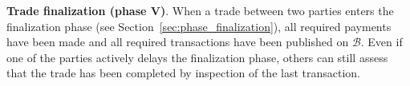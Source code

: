 \textbf{Trade finalization (phase V)}.
When a trade between two parties enters the finalization phase (see Section~\ref{sec:phase_finalization}), all required payments have been made and all required \TRPayment{} transactions have been published on $ \mathcal{B} $.
Even if one of the parties actively delays the finalization phase, others can still assess that the trade has been completed by inspection of the last \TRPayment{} transaction.




